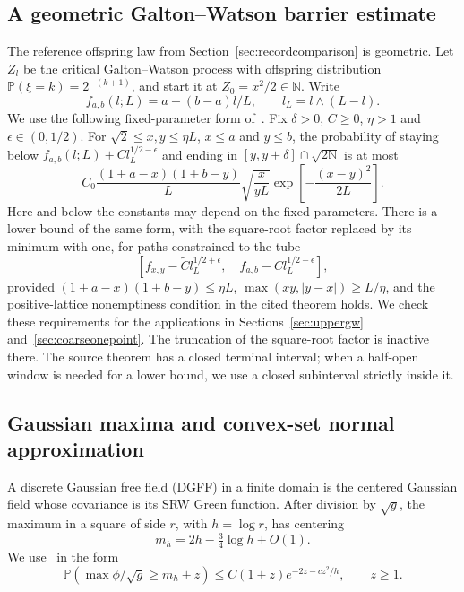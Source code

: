 \documentclass[11pt,letterpaper,reqno]{amsart}
\numberwithin{equation}{section}
\theoremstyle{remark}
\begin{document}
\subsection{A geometric Galton--Watson barrier estimate}\label{sec:gw}
The reference offspring law from Section~\ref{sec:recordcomparison} is geometric. Let $Z_l$ be the critical Galton--Watson process with offspring distribution $\mathbb P(\xi=k)=2^{-(k+1)}$, and start it at $Z_0=x^2/2\in\mathbb N$. Write
\[
f_{a,b}(l;L)=a+(b-a)l/L,\qquad l_L=l\wedge(L-l).
\]
We use the following fixed-parameter form of~\cite[Theorem 9.1]{GW}. Fix $\delta>0$, $C\ge0$, $\eta>1$ and $\epsilon\in(0,1/2)$. For $\sqrt2\le x,y\le\eta L$, $x\le a$ and $y\le b$, the probability of staying below $f_{a,b}(l;L)+Cl_L^{1/2-\epsilon}$ and ending in $[y,y+\delta]\cap\sqrt{2\mathbb N}$ is at most
\begin{equation}\label{eq:3.1}
C_0\frac{(1+a-x)(1+b-y)}L
\sqrt{\frac{x}{yL}}\exp\left[-\frac{(x-y)^2}{2L}\right].
\end{equation}
Here and below the constants may depend on the fixed parameters. There is a lower bound of the same form, with the square-root factor replaced by its minimum with one, for paths constrained to the tube
\begin{equation}\label{eq:3.2}
[f_{x,y}-\widetilde C l_L^{1/2+\epsilon},\quad
 f_{a,b}-Cl_L^{1/2-\epsilon}],
\end{equation}
provided $(1+a-x)(1+b-y)\le\eta L$, $\max(xy,|y-x|)\ge L/\eta$, and the positive-lattice nonemptiness condition in the cited theorem holds. We check these requirements for the applications in Sections~\ref{sec:uppergw} and~\ref{sec:coarseonepoint}. The truncation of the square-root factor is inactive there. The source theorem has a closed terminal interval; when a half-open window is needed for a lower bound, we use a closed subinterval strictly inside it.

\subsection{Gaussian maxima and convex-set normal approximation}\label{sec:gaussianinputs}
A discrete Gaussian free field (DGFF) in a finite domain is the centered Gaussian field whose covariance is its SRW Green function. After division by $\sqrt g$, the maximum in a square of side $r$, with $h=\log r$, has centering
\[
m_h=2h-\tfrac34\log h+O(1).
\]
We use~\cite[Lemma 3.8, equation (39)]{BDZ} in the form
\begin{equation}\label{eq:3.3}
\mathbb P(\max\phi/\sqrt g\ge m_h+z)
\le C(1+z)e^{-2z-cz^2/h},\qquad z\ge1.
\end{equation}
\end{document}
